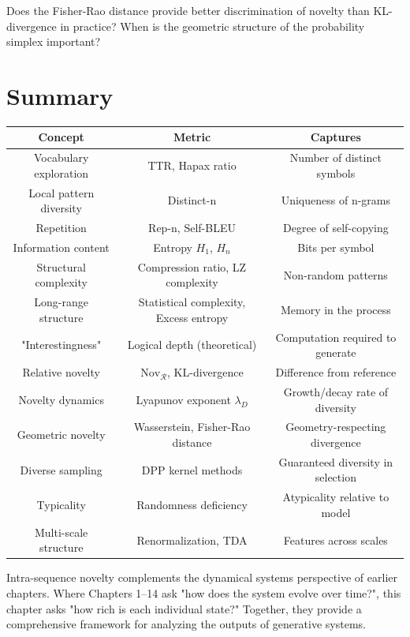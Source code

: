 \begin{question}
Does the Fisher-Rao distance provide better discrimination of novelty than KL-divergence in practice? When is the geometric structure of the probability simplex important?
\end{question}



\section{Summary}

\begin{center}
\begin{tabular}{ccc}
\toprule
Concept & Metric & Captures \\
\midrule
Vocabulary exploration & TTR, Hapax ratio & Number of distinct symbols \\
Local pattern diversity & Distinct-n & Uniqueness of n-grams \\
Repetition & Rep-n, Self-BLEU & Degree of self-copying \\
Information content & Entropy $H_1$, $H_n$ & Bits per symbol \\
Structural complexity & Compression ratio, LZ complexity & Non-random patterns \\
Long-range structure & Statistical complexity, Excess entropy & Memory in the process \\
"Interestingness" & Logical depth (theoretical) & Computation required to generate \\
Relative novelty & $\mathrm{Nov}_{\mathcal{R}}$, KL-divergence & Difference from reference \\
Novelty dynamics & Lyapunov exponent $\lambda_D$ & Growth/decay rate of diversity \\
Geometric novelty & Wasserstein, Fisher-Rao distance & Geometry-respecting divergence \\
Diverse sampling & DPP kernel methods & Guaranteed diversity in selection \\
Typicality & Randomness deficiency & Atypicality relative to model \\
Multi-scale structure & Renormalization, TDA & Features across scales \\
\bottomrule
\end{tabular}
\end{center}

Intra-sequence novelty complements the dynamical systems perspective of earlier chapters. Where Chapters 1--14 ask "how does the system evolve over time?", this chapter asks "how rich is each individual state?" Together, they provide a comprehensive framework for analyzing the outputs of generative systems.

